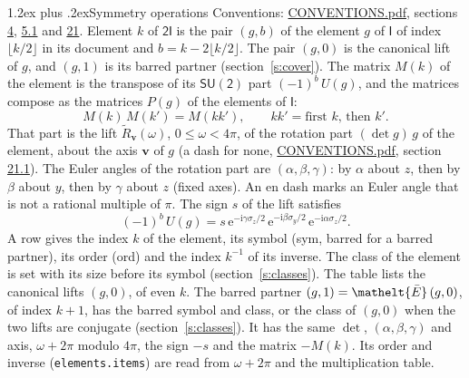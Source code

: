 \documentclass[10pt,a4paper]{article}
\makeatletter
\renewcommand\section{\@startsection{section}{1}{\z@}{-3ex plus -1ex minus -.2ex}%
  {1.2ex plus .2ex}{\normalfont\large\sffamily\bfseries\color{parttitle}}}
\numberwithin{equation}{section}
\newcommand{\eltfont}[1]{{\let\sigma\eltsigma\mathelt{#1}}}
\newcommand{\grp}[1]{\mathsf{#1}}
\newcommand{\elt}[1]{\eltfont{#1}}
\newcommand{\vv}{\mathbf{v}}
\newcommand{\iunit}{\mathrm{i}}
\newcommand{\expe}{\mathrm{e}}
\newcommand{\barred}[1]{\bar{#1}}
\newcommand{\lift}[1]{\tilde{#1}}
\newcommand{\pauli}[1]{\sigma_{#1}}
\makeatother
\begin{document}
\section{Symmetry operations}\label{s:elements}
Conventions: \href{../../CONVENTIONS.pdf}{CONVENTIONS.pdf}, sections \href{../../../rotation/CONVENTIONS.pdf\#conv.4}{4}, \href{../../../rotation/CONVENTIONS.pdf\#conv.5.1}{5.1} and \href{../../CONVENTIONS.pdf\#conv.21}{21}.
\leavevmode\label{n:index.element}\label{n:element.g}Element $k$ of $\grp{2I}$ is the pair $(g, b)$ of the element $g$ of \href{../../../rotation/data/pdf/I.pdf}{$\grp{I}$} of index $\lfloor k/2\rfloor$ in its document and $b = k - 2\lfloor k/2\rfloor$. The pair $(g, 0)$ is the canonical lift of $g$, and $(g, 1)$ is its barred partner (section~\ref{s:cover}). \label{n:matrix.element.pin}\label{n:matrix.element}The matrix $M(k)$ of the element is the transpose of its $\grp{SU(2)}$ part $(-1)^{b}\,U(g)$, and the matrices compose as the matrices $P(g)$ of the elements of $\grp{I}$:
\begin{equation}\label{e:mprod}M(k)\,M(k') = M(kk'),\qquad kk' = \text{first } k\text{, then } k'.\end{equation}
\leavevmode\label{n:angle.omega}\label{n:vector.axis}\label{n:vector.pole}That part is the lift $\lift{R}_{\vv}(\omega)$, $0 \le \omega < 4\pi$, of the rotation part $(\det g)\,g$ of the element, about the axis $\vv$ of $g$ (a dash for none, \href{../../CONVENTIONS.pdf}{CONVENTIONS.pdf}, section \href{../../CONVENTIONS.pdf\#conv.21.1}{21.1}). \label{n:angle.euler.alpha}\label{n:angle.euler.beta}\label{n:angle.euler.gamma}\label{n:vector.coordinates}The Euler angles of the rotation part are $(\alpha,\beta,\gamma)$: by $\alpha$ about $z$, then by $\beta$ about $y$, then by $\gamma$ about $z$ (fixed axes). \label{n:mark.irrational}An en dash marks an Euler angle that is not a rational multiple of $\pi$. \label{n:local.euler.sign}The sign $s$ of the lift satisfies
\begin{equation}\label{e:euler}(-1)^{b}\,U(g) = s\,\expe^{-\iunit\gamma\pauli{z}/2}\,\expe^{-\iunit\beta\pauli{y}/2}\,\expe^{-\iunit\alpha\pauli{z}/2}.\end{equation}
\leavevmode\label{n:index.element.inverse}\label{n:head.sym}\label{n:head.ord}A row gives the index $k$ of the element, its symbol (sym, barred for a barred partner), its order (ord) and the index $k^{-1}$ of its inverse. \label{n:head.class}The class of the element is set with its size before its symbol (section~\ref{s:classes}).
The table lists the canonical lifts $(g, 0)$, of even $k$. The barred partner $(g, 1) = \elt{\barred{E}}\,(g, 0)$, of index $k + 1$, has the barred symbol and class, or the class of $(g, 0)$ when the two lifts are conjugate (section~\ref{s:classes}). It has the same $\det$, $(\alpha,\beta,\gamma)$ and axis, $\omega + 2\pi$ modulo $4\pi$, the sign $-s$ and the matrix $-M(k)$. Its order and inverse (\texttt{elements.items}) are read from $\omega + 2\pi$ and the multiplication table.
\end{document}
